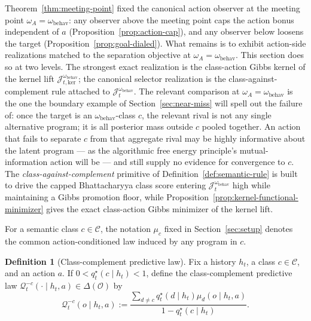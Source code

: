 \documentclass[11pt]{article}
\theoremstyle{definition}
\newtheorem{definition}[theorem]{Definition}
\theoremstyle{remark}
\newcommand{\Ccal}{\mathcal{C}}
\newcommand{\Ocal}{\mathcal{O}}
\newcommand{\Qcal}{\mathcal{Q}}
\begin{document}
Theorem~\ref{thm:meeting-point} fixed the canonical action observer at the meeting point $\omega_A=\omega_{\mathrm{behav}}$: any observer above the meeting point caps the action bonus independent of $a$ (Proposition~\ref{prop:action-cap}), and any observer below loosens the target (Proposition~\ref{prop:goal-dialed}). What remains is to exhibit action-side realizations matched to the separation objective at $\omega_A=\omega_{\mathrm{behav}}$. This section does so at two levels. The strongest exact realization is the class-action Gibbs kernel of the kernel lift $\mathcal J_{t,\mathrm{ker}}^{\omega_{\mathrm{behav}}}$; the canonical selector realization is the class-against-complement rule attached to $\mathcal J_t^{\omega_{\mathrm{behav}}}$. The relevant comparison at $\omega_A=\omega_{\mathrm{behav}}$ is the one the boundary example of Section~\ref{sec:near-miss} will spell out the failure of: once the target is an $\omega_{\mathrm{behav}}$-class $c$, the relevant rival is not any single alternative program; it is all posterior mass outside $c$ pooled together. An action that fails to separate $c$ from that aggregate rival may be highly informative about the latent program --- as the algorithmic free energy principle's mutual-information action will be --- and still supply no evidence for convergence to $c$. The \emph{class-against-complement} primitive of Definition~\ref{def:semantic-rule} is built to drive the capped Bhattacharyya class score entering $\mathcal J_t^{\omega_{\mathrm{behav}}}$ high while maintaining a Gibbs promotion floor, while Proposition~\ref{prop:kernel-functional-minimizer} gives the exact class-action Gibbs minimizer of the kernel lift.

For a semantic class $c\in\Ccal$, the notation $\mu_c$ fixed in Section~\ref{sec:setup} denotes the common action-conditioned law induced by any program in $c$.

\begin{definition}[Class-complement predictive law]
\label{def:class-complement}
Fix a history $h_t$, a class $c\in\Ccal$, and an action $a$. If $0<q_t^\star(c\mid h_t)<1$, define the class-complement predictive law $\Qcal_t^{-c}(\cdot\mid h_t,a)\in\Delta(\Ocal)$ by
\[
\Qcal_t^{-c}(o\mid h_t,a)
:=
\frac{\sum_{d\neq c} q_t^\star(d\mid h_t)\mu_d(o\mid h_t,a)}
{1-q_t^\star(c\mid h_t)}.
\]
\end{definition}
\end{document}
